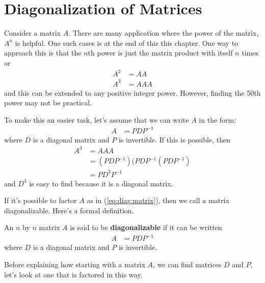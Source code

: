 \section{Diagonalization of Matrices} 

Consider a matrix $A$.  There are many application where the power of the matrix, $A^n$ is helpful. One such cases is at the end of this this chapter.  One way to approach this is that the $n$th power is just the matrix product with itself $n$ times or 
%
\begin{align*}
A^2 & = A A \\
A^3 & = A A A
\end{align*}
and this can be extended to any positive integer power.  However, finding the 50th power may not be practical. 

To make this an easier task, let's assume that we can write $A$ in the form:
% 
\begin{align}
A &= P D P^{-1} \label{eq:diag:matrix}
\end{align}
where $D$ is a diagonal matrix and $P$ is invertible.  If this is possible, then 
% 
\begin{align*}
A^3 & = A A A \\
& = (P D P^{-1}) (P D P^{-1}(P D P^{-1}) \\
& = P D^3 P^{-1}  
\end{align*}
and $D^3$ is easy to find because it is a diagonal matrix.   

If it's possible to factor $A$ as in (\ref{eq:diag:matrix}), then we call a matrix diagonalizable.  Here's a formal definition. 


\begin{definition}
An $n$ by $n$  matrix $A$ is said to be \textbf{diagonalizable} if it can be written 
% 
\begin{align*}
A & = P D P^{-1} 
\end{align*}
where $D$ is a diagonal matrix and $P$ is invertible. 
\end{definition}

Before explaining how starting with a matrix $A$, we can find matrices $D$ and $P$, let's look at one that is factored in this way. 


